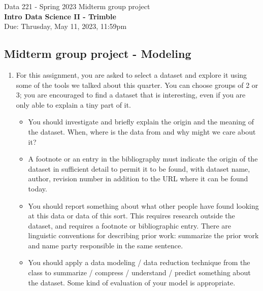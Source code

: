 \documentclass[]{book}
\theoremstyle{definition}
\begin{document}
\begin{center}
{\Large Data 221 - Spring 2023 \hspace{0.5cm} Midterm group project }\\
\textbf{Intro Data Science II - Trimble}\\ %
Due:  Thrusday, May 11, 2023, 11:59pm
\end{center}

\vspace{0.2 cm}

\subsection*{Midterm group project - Modeling }

\begin{enumerate}
\item\label{norms}

For this assignment, you are asked to select a dataset and explore it using some of the tools we talked about this quarter.  You can choose groups of 2 or 3; you are encouraged to find a dataset that is interesting, even if you are only able to explain a tiny part of it.

\begin{itemize}
\item  You should investigate and briefly explain the origin and the meaning of the dataset.  When, where is the data from and why might we care about it?  

\item A footnote or an entry in the bibliography must indicate the origin of the dataset in sufficient detail to permit it to be found, with dataset name, author, revision number in addition to the URL where it can be found today.  

\item You should report something about what other people have found looking at this data or data of this sort.  This requires research outside the dataset, and requires a footnote or bibliographic entry. There are linguistic conventions for describing prior work: summarize the prior work and name party responsible in the same sentence.

\item You should apply a data modeling / data reduction technique from the class to summarize / compress / understand / predict something about the dataset.  Some kind of evaluation of your model is appropriate.


\end{itemize}
\end{enumerate}
\end{document}
